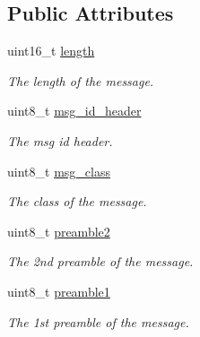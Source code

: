 \subsection*{Public Attributes}
\begin{DoxyCompactItemize}
\item 
\hypertarget{structubx__header__t_a059a05a247b43d7b7aa91942b12f1090}{uint16\+\_\+t \hyperlink{structubx__header__t_a059a05a247b43d7b7aa91942b12f1090}{length}}\label{structubx__header__t_a059a05a247b43d7b7aa91942b12f1090}

\begin{DoxyCompactList}\small\item\em The length of the message. \end{DoxyCompactList}\item 
\hypertarget{structubx__header__t_a8154cbc5eaf684bec01c11fc226b81ff}{uint8\+\_\+t \hyperlink{structubx__header__t_a8154cbc5eaf684bec01c11fc226b81ff}{msg\+\_\+id\+\_\+header}}\label{structubx__header__t_a8154cbc5eaf684bec01c11fc226b81ff}

\begin{DoxyCompactList}\small\item\em The msg id header. \end{DoxyCompactList}\item 
\hypertarget{structubx__header__t_a671d4dad2ddc4c6681f1e470b079ca6d}{uint8\+\_\+t \hyperlink{structubx__header__t_a671d4dad2ddc4c6681f1e470b079ca6d}{msg\+\_\+class}}\label{structubx__header__t_a671d4dad2ddc4c6681f1e470b079ca6d}

\begin{DoxyCompactList}\small\item\em The class of the message. \end{DoxyCompactList}\item 
\hypertarget{structubx__header__t_aa23c4f009ef9eaf9a920697af1de95d3}{uint8\+\_\+t \hyperlink{structubx__header__t_aa23c4f009ef9eaf9a920697af1de95d3}{preamble2}}\label{structubx__header__t_aa23c4f009ef9eaf9a920697af1de95d3}

\begin{DoxyCompactList}\small\item\em The 2nd preamble of the message. \end{DoxyCompactList}\item 
\hypertarget{structubx__header__t_a14ed820f7f80c54bc91af15f52db14c7}{uint8\+\_\+t \hyperlink{structubx__header__t_a14ed820f7f80c54bc91af15f52db14c7}{preamble1}}\label{structubx__header__t_a14ed820f7f80c54bc91af15f52db14c7}

\begin{DoxyCompactList}\small\item\em The 1st preamble of the message. \end{DoxyCompactList}\end{DoxyCompactItemize}


